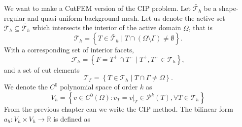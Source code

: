 We want to make a CutFEM version of the CIP problem. Let $\widetilde{\mathcal{T}_{h} } $ be a shape-regular and quasi-uniform background mesh. Let us denote the active set $\mathcal{T} _{h} \subseteq \widetilde{\mathcal{T}_{h}}$ which intersects the interior of the active domain $\Omega $, that is  \[
\mathcal{T} _{h} = \left\{ T \in \widetilde{\mathcal{T} _{h}}  \mid  T \cap (\Omega \setminus \Gamma ) \neq \emptyset    \right\} .
\]
With a corresponding set of interior facets, \[
    \mathcal{F} _{h} = \left\{ F = T^{+} \cap T^{-}  \mid  T^{+}, T^{-} \in \mathcal{T} _{h} \right\},
\]
and a set of cut elements \[
\mathcal{T} _{\Gamma } = \left\{ T \in \mathcal{T} _{h}   \mid  T \cap \Gamma \neq \Omega \right\}.
\]
We denote the $C^{0}$ polynomial space of order $k$ as
\[
V_{h} = \left\{ v \in C^{0}\left( \Omega  \right): v_{T} = v | _{T} \in \mathcal{P} ^{k}\left( T \right), \forall T \in
\mathcal{T}_{h}    \right\}
\]
From the previous chapter can we write the CIP method. The bilinear form $a_{h}:  V_{h}\times  V_{h} \to \mathbb{R} $ is defined as

